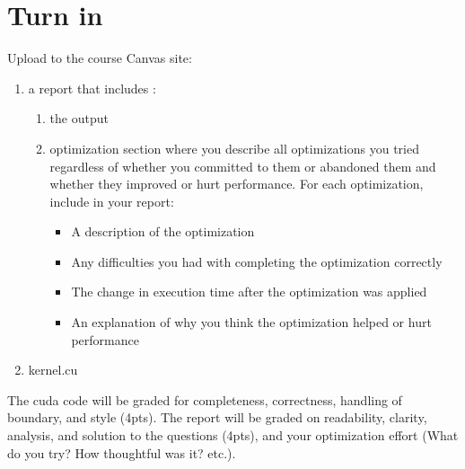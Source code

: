 \documentclass{article}
\begin{document}
\section{Turn in}
Upload to the course Canvas site:
\begin{enumerate}
\item a report that includes :
	\begin{enumerate}
	\item the output
	\item optimization section where you describe all optimizations you tried regardless of whether you committed to them or abandoned them and whether they improved or hurt performance. For each optimization, include in your report:
		\begin{itemize}
		\item A description of the optimization
		\item Any difficulties you had with completing the optimization correctly
		\item The change in execution time after the optimization was applied
		\item An explanation of why you think the optimization helped or hurt performance
		\end{itemize}
	\end{enumerate}
\item kernel.cu
\end{enumerate}


The cuda code will be graded for completeness, correctness, handling of boundary, and style (4pts).  The report will be graded on readability, clarity, analysis, and solution to the questions (4pts), and your optimization effort (What do you try? How thoughtful was it? etc.).
\end{document}
